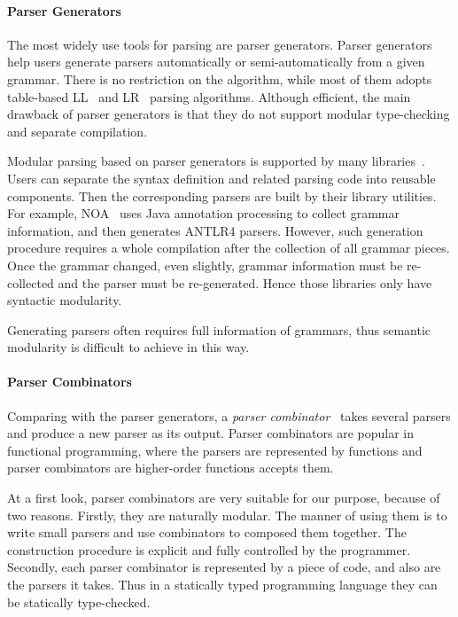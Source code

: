 \paragraph{Parser Generators} The most widely use tools for parsing
are parser generators. Parser generators help users generate parsers automatically or
semi-automatically from a given grammar. There is no restriction on
the algorithm, while most of them adopts table-based LL~\cite{lewis1968syntax} and LR~\cite{knuth1965translation} parsing
algorithms.
Although efficient, the main drawback of parser generators is that they do not support
modular type-checking and separate compilation.

Modular parsing based on parser generators is supported by many libraries~\cite{antlr1995,Grimm2006,Gouseti2014,Warth2016}. Users can separate the syntax definition and related parsing code into reusable components. Then the corresponding parsers are built by their library utilities. For example, NOA~\cite{Gouseti2014} uses Java annotation processing to collect grammar information, and then generates ANTLR4 parsers. However, such generation procedure requires a whole compilation after the collection of all grammar pieces. Once the grammar changed, even slightly, grammar information must be re-collected and the parser must be re-generated. Hence those libraries only have syntactic modularity.

Generating parsers often requires full information of grammars, thus semantic modularity is difficult to achieve in this way.

\paragraph{Parser Combinators}
Comparing with the parser generators, a \textit{parser combinator}~\cite{burge1975,Wadler1985}
takes several parsers and produce a new parser as its output. Parser combinators are
popular in functional programming, where the parsers are represented
by functions and parser combinators are higher-order functions accepts
them.

At a first look, parser combinators are very suitable for our purpose, because of two
reasons. Firstly, they are naturally modular. The manner of using them
is to write small parsers and use combinators to composed them
together. The construction procedure is explicit and fully controlled
by the programmer. Secondly, each parser combinator is represented by
a piece of code, and also are the parsers it takes. Thus in a
statically typed programming language they can be statically
type-checked.

